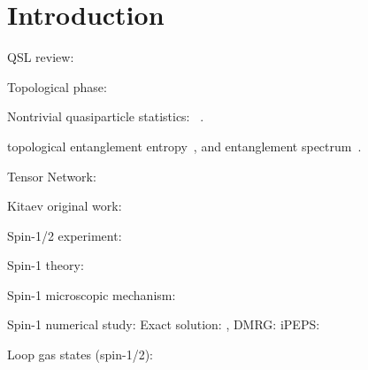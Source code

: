\documentclass{ntuthesis}
\newcommand{\citep}{\cite}
\begin{document}
\frontmatter

\makecover

\ifdefined\excludefirstpage

  \ifdefined\withwatermark
    \newsavebox\mybox
    \savebox{}
    \newwatermark*[allpages,xpos=6.1725cm,ypos=10.5225cm,scale=0.5]{\usebox\mybox}
  \fi

  \ifdefined\withdoi
    \insertdoi
  \fi
\fi

\makecertification




\tableofcontents
\listoffigures
\listoftables

\mainmatter

%
\chapter{Introduction}
\label{c:intro}

QSL review:
\cite{Savary_2016, RevModPhys.89.025003, Broholmeaay0668}

Topological phase:
\cite{Wen1989,Wen1990}

Nontrivial quasiparticle statistics:
~\cite{wen_1990,Wen1993,KITAEV20062, Bais_2012, Zhang_2012}.

topological entanglement entropy~\cite{ Kitaev2006, Levin2006,Xie_2010}, and  entanglement spectrum~\cite{Haldane_2008,Pollmann_2010,Turner_2011}.

Tensor Network:
\citep{2008_PEPS}


Kitaev original work:
\citep{Kitaev2006}

Spin-1/2 experiment:
\citep{PhysRevLett.108.127203, doi:10.1146/annurev-conmatphys-020911-125138,doi:10.1146/annurev-conmatphys-031115-011319, Winter_2017, PhysRevB.90.041112, Kasahara_2018}

Spin-1 theory:
\citep{Baskaran_2008,PhysRevB.99.104408, PhysRevB.98.214404}

Spin-1 microscopic mechanism:
\citep{PhysRevLett.123.037203}

Spin-1 numerical study:
Exact solution: \citep{2018_exact_spin1},
DMRG: \citep{2018_Kitaev_QSL,PhysRevB.102.121102,PhysRevResearch.2.022047,PhysRevResearch.3.013160}
iPEPS: \citep{2020-spin-one-kitaev,lee2020anisotropy}

Loop gas states (spin-1/2):
\citep{spin_one_half, non-AbelianTO_2020, Lee_2020}
\end{document}
